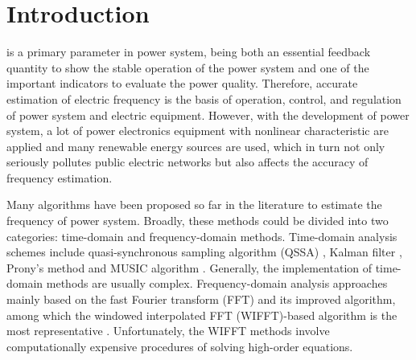 \documentclass[journal,twoside]{IEEEtran}
\begin{document}
%
\IEEEpeerreviewmaketitle

\section{Introduction}
% 
% 
% 
% 

 is a primary parameter in power system, being both an essential feedback quantity to show the stable operation of the power system and one of the important indicators to evaluate the power quality. Therefore, accurate estimation of electric frequency is the basis of operation, control, and regulation of power system and electric equipment. However, with the development of power system, a lot of power electronics equipment with nonlinear characteristic are applied and many renewable energy sources are used, which in turn not only seriously pollutes public electric networks but also affects the accuracy of frequency estimation.

Many algorithms have been proposed so far in the literature to estimate the frequency of power system. Broadly, these methods could be divided into two categories: time-domain and frequency-domain methods. Time-domain analysis schemes include quasi-synchronous sampling algorithm (QSSA) \cite{Zhou2011}, Kalman filter \cite{Bagheri2016}, Prony's method \cite{Zygarlicki2010} and MUSIC algorithm \cite{Lobos2006}. Generally, the implementation of time-domain methods are usually complex. Frequency-domain analysis approaches mainly based on the fast Fourier transform (FFT) and its improved algorithm, among which the windowed interpolated FFT (WIFFT)-based algorithm is the most representative \cite{Harris1978,Wen2011,Wen2014}. Unfortunately, the WIFFT methods involve computationally expensive procedures of solving high-order equations.
\end{document}
